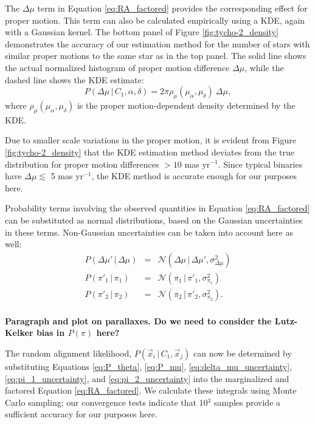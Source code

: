 \documentclass[usenatbib]{mnras}
\newcommand{\given}{\,|\,}
\begin{document}
The $\Delta \mu$ term in Equation \ref{eq:RA_factored} provides the corresponding effect for proper motion. This term can also be calculated empirically using a KDE, again with a Gaussian kernel. The bottom panel of Figure \ref{fig:tycho-2_density} demonstrates the accuracy of our estimation method for the number of stars with similar proper motions to the same star as in the top panel. The solid line shows the actual normalized histogram of proper motion difference $\Delta \mu$, while the dashed line shows the KDE estimate: 
\begin{equation}
P(\Delta \mu \given C_1, \alpha, \delta) = 2 \pi \rho_{\mu}(\mu_{\alpha}, \mu_{\delta})\ \Delta \mu, \label{eq:P_mu}
\end{equation}
where $\rho_{\mu}(\mu_{\alpha}, \mu_{\delta})$ is the proper motion-dependent density determined by the KDE.

Due to smaller scale variations in the proper motion, it is evident from Figure \ref{fig:tycho-2_density} that the KDE estimation method deviates from the true distribution for proper motion differences $>10$ mas yr$^{-1}$. Since typical binaries have $\Delta \mu \lesssim$ 5 mas yr$^{-1}$, the KDE method is accurate enough for our purposes here. 




Probability terms involving the observed quantities in Equation \ref{eq:RA_factored} can be substituted as normal distributions, based on the Gaussian uncertainties in these terms. Non-Gaussian uncertainties can be taken into account here as well:
\begin{eqnarray}
P(\Delta \mu' \given \Delta \mu) &=& \mathcal{N}(\Delta \mu \given \Delta \mu', \sigma^2_{\Delta \mu}) \label{eq:delta_mu_uncertainty} \\
P(\pi'_1 \given \pi_1) &=& \mathcal{N}(\pi_1 \given \pi'_1, \sigma^2_{\pi_1}) \label{eq:pi_1_uncertainty} \\
P(\pi'_2 \given \pi_2) &=& \mathcal{N}(\pi_2 \given \pi'_2, \sigma^2_{\pi_2}). \label{eq:pi_2_uncertainty} \\
\end{eqnarray}


{\bf Paragraph and plot on parallaxes. Do we need to consider the Lutz-Kelker bias in $P(\pi)$ here?}


The random alignment likelihood, $P(\vec{x}_i \given C_1, \vec{x}_j)$ can now be determined by substituting  Equations \ref{eq:P_theta}, \ref{eq:P_mu}, \ref{eq:delta_mu_uncertainty}, \ref{eq:pi_1_uncertainty}, and \ref{eq:pi_2_uncertainty} into the marginalized and factored Equation \ref{eq:RA_factored}. We calculate these integrals using Monte Carlo sampling; our convergence tests indicate that 10$^3$ samples provide a sufficient accuracy for our purposes here.
\end{document}
